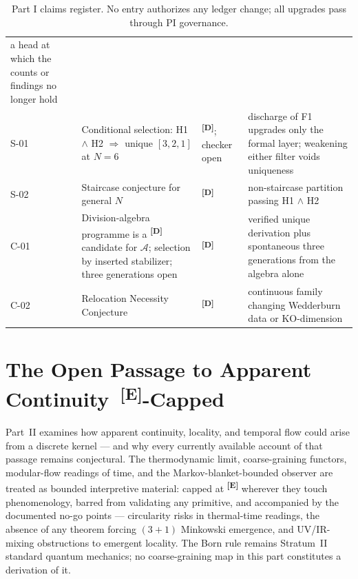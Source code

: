 \documentclass[12pt,a4paper,twoside]{article}
\theoremstyle{plain}
\theoremstyle{definition}
\theoremstyle{remark}
\newcommand{\catmark}[1]{\textsuperscript{\textsf{\textbf{[#1]}}}}
\begin{document}
\begin{table}[htbp]
\begin{tabular}{@{}lp{5.3cm}lp{4.3cm}@{}}
a head at which the counts or findings no longer hold \\
S-01 & Conditional selection: H1 $\wedge$ H2 $\Rightarrow$ unique
$[3,2,1]$ at $N=6$ & \catmark{D}; checker open & discharge of F1
upgrades only the formal layer; weakening either filter voids
uniqueness \\
S-02 & Staircase conjecture for general $N$ & \catmark{D} &
non-staircase partition passing H1 $\wedge$ H2 \\
C-01 & Division-algebra programme is a \catmark{D} candidate for
$\mathcal A$; selection by inserted stabilizer; three generations open
& \catmark{D} & verified unique derivation plus spontaneous three
generations from the algebra alone \\
C-02 & Relocation Necessity Conjecture & \catmark{D} & continuous
family changing Wedderburn data or KO-dimension \\
\bottomrule
\end{tabular}
\caption{Part I claims register. No entry authorizes any ledger change;
all upgrades pass through PI governance.}
\label{tab:part1-claims}
\end{table}



\newpage
\part{The Open Passage to Apparent Continuity\texorpdfstring{\ \catmark{E}}{[E]}-Capped}
\label{part:continuous-limit}

\noindent Part~II examines how apparent continuity, locality, and temporal
flow could arise from a discrete kernel --- and why every currently
available account of that passage remains conjectural. The thermodynamic
limit, coarse-graining functors, modular-flow readings of time, and the
Markov-blanket-bounded observer are treated as bounded interpretive
material: capped at \catmark{E} wherever they touch phenomenology, barred
from validating any primitive, and accompanied by the documented no-go
points --- circularity risks in thermal-time readings, the absence of any
theorem forcing $(3{+}1)$ Minkowski emergence, and UV/IR-mixing
obstructions to emergent locality. The Born rule remains Stratum~II
standard quantum mechanics; no coarse-graining map in this part
constitutes a derivation of it.
\end{document}
